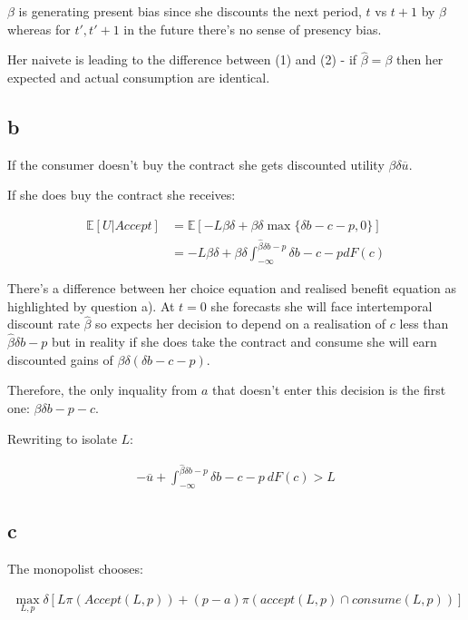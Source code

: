 \documentclass{article}
\begin{document}
$\beta$ is generating present bias since she discounts the next period, $t$ vs 
$t+1$ by $\beta$ whereas for $t', t'+1$ in the future there's no sense of 
presency bias.


Her naivete is leading to the difference between (1) and (2) - if $\hat{\beta} = \beta$
then her expected and actual consumption are identical.


\subsection*{b}


If the consumer doesn't buy the contract she gets discounted utility $\beta \delta \overline{u}$.

If she does buy the contract she receives:

\begin{align*}
    \mathbb{E}[U | \textit{Accept}] &= \mathbb{E}\left[ 
        -L\beta \delta + \beta \delta \max\{\delta b - c - p, 0\} 
    \right] \\
    &= -L \beta \delta + \beta \delta \int^{\hat{\beta}\delta b - p}_{-\infty} \delta b - c - p dF(c)
\end{align*}


There's a difference between her choice equation and realised benefit equation as 
highlighted by question a). At $t=0$ she forecasts she will face intertemporal 
discount rate $\hat{\beta}$ so expects her decision to depend on a realisation of 
$c$ less than $\hat{\beta}\delta b - p$ but in reality if she does take the 
contract and consume she will earn discounted gains of $\beta \delta (\delta b - c - p)$. 



Therefore, the only inquality from $a$ that doesn't enter this decision is the 
first one: $\beta \delta b - p - c$.


Rewriting to isolate $L$:

\begin{align*}
    - \overline{u} + \int^{\hat{\beta}\delta b - p}_{-\infty} \delta b - c - p \ dF(c) > L
\end{align*}

\subsection*{c}


The monopolist chooses:

\begin{align*}
    \max_{L,p} \delta \left[ L \pi(\textit{Accept}(L, p)) + (p - a) \pi(\textit{accept}(L, p) \cap \textit{consume}(L, p)) \right]
\end{align*}
\end{document}
